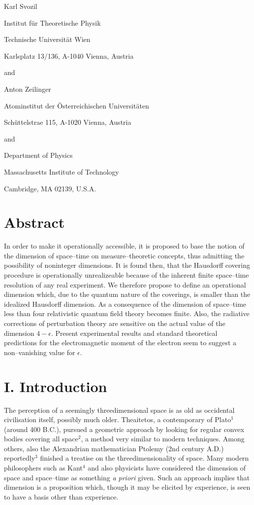  
\doublespacing
{}
\vskip 1cm
\bf
\centerline{Karl Svozil}
\sl
\centerline{Institut f\"ur Theoretische Physik}
\centerline{Technische Universit\"at Wien}
\centerline{Karlsplatz 13/136, A-1040 Vienna, Austria}
\vskip 0.5cm
\centerline{and}
\vskip 0.5cm
\bf
\centerline{Anton Zeilinger}
\sl
\centerline{Atominstitut der \"Osterreichischen Universit\"aten}
\centerline{Sch\"uttelstra\3e 115, A-1020 Vienna, Austria}
\centerline{and}
\centerline{Department of Physics}
\centerline{Massachusetts Institute of Technology}
\centerline{Cambridge, MA 02139, U.S.A.}
\rm
\vskip 1cm
\chapter{Abstract}
In order to make it operationally accessible, it
is proposed to base the notion of the dimension
of space--time on measure--theoretic concepts,
thus admitting the possibility of noninteger dimensions.
It is found then, that the Hausdorff covering procedure
is operationally unrealizeable because of the inherent
finite space--time resolution of any real experiment.
We therefore propose to define an operational dimension
which, due to the quantum nature of the coverings,
is smaller than the idealized Hausdorff dimension.
As a consequence of the dimension of space--time less
than four relativistic quantum field theory becomes finite.
Also, the radiative corrections of perturbation theory
are sensitive on the actual value of the
dimension $4-\epsilon $.
Present experimental results and standard theoretical
predictions for the electromagnetic moment of the electron
seem to suggest a non--vanishing value for $\epsilon $.
\endchapter
\chapter{I. Introduction}
The perception of a seemingly threedimensional
space is as old as occidental civilisation
itself, possibly much older.
Theaitetos, a contemporary of Plato$^{1}$ (around
400 B.C.), pursued a geometric approach by looking
for regular convex bodies covering all
space$^{2}$, a method very similar to modern
techniques.
Among others, also the Alexandrian mathematician
Ptolemy (2nd century A.D.) reportedly$^{3}$
finished a treatise on the threedimensionality of space.
Many modern philosophers such as Kant$^{4}$ and
also physicists have considered the dimension of space
and space--time as something {\it a priori}
given.
Such an approach implies that dimension is a proposition which, though
it may be elicited by experience,
is seen to have a basis other than experience.



